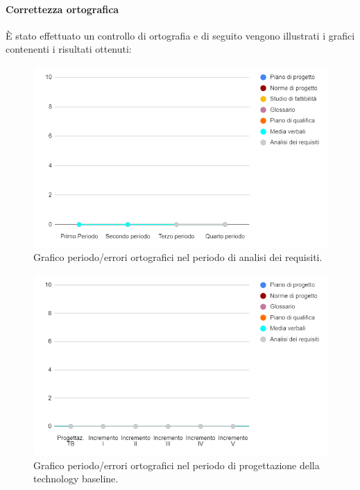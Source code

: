 \paragraph{Correttezza ortografica}
È stato effettuato un controllo di ortografia e di seguito vengono illustrati i grafici contenenti i risultati ottenuti:

\begin{figure}[H]
	\centering
	\includegraphics[width=0.8\linewidth]{./res/images/ortografia_1.png}
	\caption{Grafico periodo/errori ortografici nel periodo di analisi dei requisiti.}
	\label{fig:Grafico errori ortografici durante il periodo di analisi dei requisiti.}
\end{figure}

\begin{figure}[H]
	\centering
	\includegraphics[width=0.8\linewidth]{./res/images/ortografia_2.png}
	\caption{Grafico periodo/errori ortografici nel periodo di progettazione della technology baseline.}
	\label{fig:Grafico errori ortografici durante il periodo di progettazione della technology baseline.}
\end{figure}

